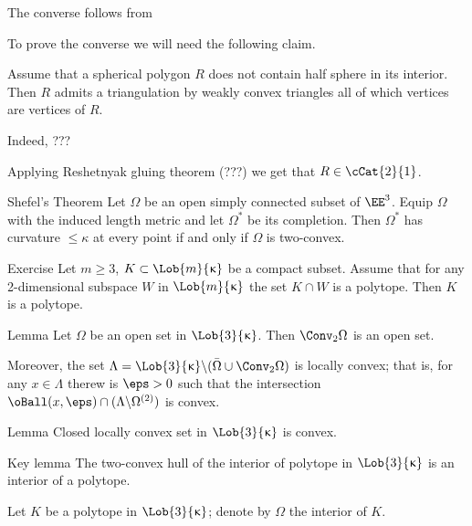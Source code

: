 The converse follows from 

To prove the converse we will need the following claim.
\begin{clm}{}
Assume that a spherical polygon $R$ does not contain half sphere in its interior.
Then $R$ admits a triangulation by weakly convex triangles all of which vertices are vertices of $R$.
\end{clm}

Indeed, ???\claimqeds

Applying Reshetnyak gluing theorem (???) we get that $R\in\cCat{2}{1}$.

\qeds


\begin{thm}{Shefel's Theorem}\label{thm:shefel}
Let $\Omega$ be an open simply connected 
subset of $\EE^3$.
Equip $\Omega$ with the induced length metric 
and let $\Omega^*$ be its completion.
Then $\Omega^*$ has curvature $\le\kappa$ at every point 
if and only if $\Omega$ is two-convex.
\end{thm}


\begin{thm}{Exercise}\label{ex:polygon-slices}
Let $m\ge 3$,
$K\subset \Lob{m}{\kappa}$ be a compact subset.
Assume that for any 2-dimensional subspace $W$ in $\Lob{m}{\kappa}$
the set $K\cap W$ is a polytope. 
Then $K$ is a polytope.
\end{thm}

\begin{thm}{Lemma}\label{lem:loc-concave}
Let $\Omega$ be an open set in $\Lob{3}{\kappa}$.
Then $\Conv_2\Omega$ is an open set.
 
Moreover, the set $\Lambda=\Lob{3}{\kappa}\backslash(\bar\Omega\cup\Conv_2\Omega)$
 is locally convex;
that is, for any $x\in\Lambda$ therew is $\eps>0$ such that the intersection
$\oBall(x,\eps)\cap(\Lambda\backslash\Omega^{(2)})$
is convex.
\end{thm}

\begin{thm}{Lemma}
Closed locally convex set in $\Lob{3}{\kappa}$ is convex. 
\end{thm}




\begin{thm}{Key lemma}
The two-convex hull of the interior of polytope in $\Lob{3}{\kappa}$
is an interior of a polytope.
\end{thm}

Let $K$ be a polytope in $\Lob{3}{\kappa}$;
denote by $\Omega$ the interior of $K$.

